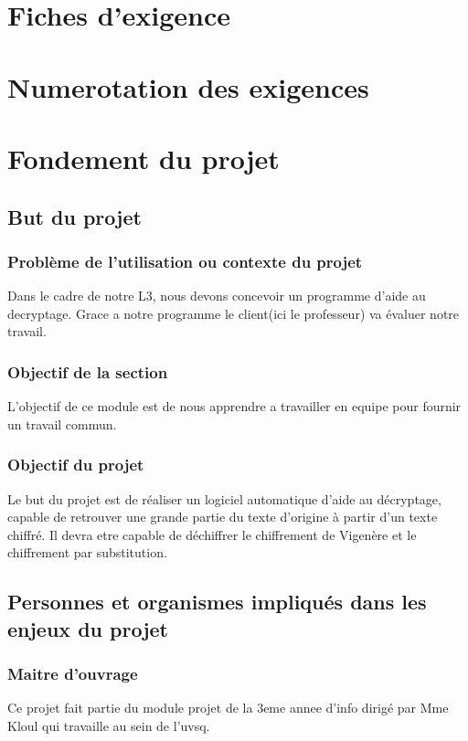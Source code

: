 \documentclass[a4]{article}
\begin{document}
		\section{Fiches d'exigence}
				 
	\section{Numerotation des exigences}
				 
		
	\section{Fondement du projet}
		\subsection{But du projet} 
			\subsubsection{Problème de l'utilisation ou contexte du projet}
				Dans le cadre de notre L3, nous devons concevoir un programme d'aide au decryptage.
				Grace a notre programme le client(ici le professeur) va évaluer notre travail.
			\subsubsection{Objectif de la section}
				L'objectif de ce module est de nous apprendre a travailler en equipe pour fournir un travail 					commun.
			\subsubsection{Objectif du projet}
				Le but du projet est de réaliser un logiciel automatique d'aide au décryptage, capable de retrouver une 					grande partie du texte d'origine à partir d'un texte chiffré. Il devra etre capable de 					déchiffrer le chiffrement de Vigenère et le chiffrement par substitution.
		\subsection{Personnes et organismes impliqués dans les enjeux du projet} 
			\subsubsection{Maitre d'ouvrage}
				Ce projet fait partie du module projet de la 3eme annee d'info dirigé par Mme Kloul qui 				travaille au sein de l'uvsq.			
\end{document}
